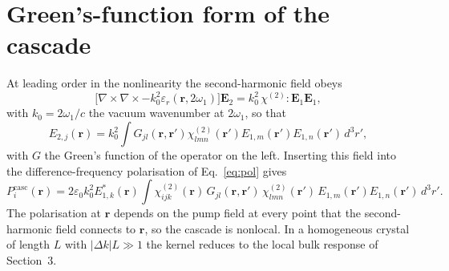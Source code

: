 \documentclass[9pt]{osa-supplemental-document}
\newcommand{\chitwo}{\chi^{(2)}}
\begin{document}
\section{Green's-function form of the cascade}

At leading order in the nonlinearity the second-harmonic field obeys
\begin{equation}
  \bigl[\nabla\times\nabla\times-k_0^2\varepsilon_r(\mathbf r,2\omega_1)\bigr]\mathbf E_2
  =k_0^2\,\chitwo\!:\!\mathbf E_1\mathbf E_1 ,
  \label{eq:shwave}
\end{equation}
with $k_0=2\omega_1/c$ the vacuum wavenumber at $2\omega_1$, so that
\begin{equation}
  E_{2,j}(\mathbf r)=k_0^2\int G_{jl}(\mathbf r,\mathbf r')\chitwo_{lmn}(\mathbf r')E_{1,m}(\mathbf r')E_{1,n}(\mathbf r')\,d^3r' ,
\end{equation}
with $G$ the Green's function of the operator on the left.  Inserting this
field into the difference-frequency polarisation of Eq.~\eqref{eq:pol} gives
\begin{equation}
  P_i^{\mathrm{casc}}(\mathbf r)=2\varepsilon_0k_0^2E^*_{1,k}(\mathbf r)
  \int\chitwo_{ijk}(\mathbf r)\,G_{jl}(\mathbf r,\mathbf r')\,\chitwo_{lmn}(\mathbf r')\,
  E_{1,m}(\mathbf r')E_{1,n}(\mathbf r')\,d^3r' .
  \label{eq:kernel}
\end{equation}
The polarisation at $\mathbf r$ depends on the pump field at every point
that the second-harmonic field connects to $\mathbf r$, so the cascade is
nonlocal.  In a homogeneous crystal of length $L$ with $|\Delta k|L\gg1$
the kernel reduces to the local bulk response of Section~3.
\end{document}
